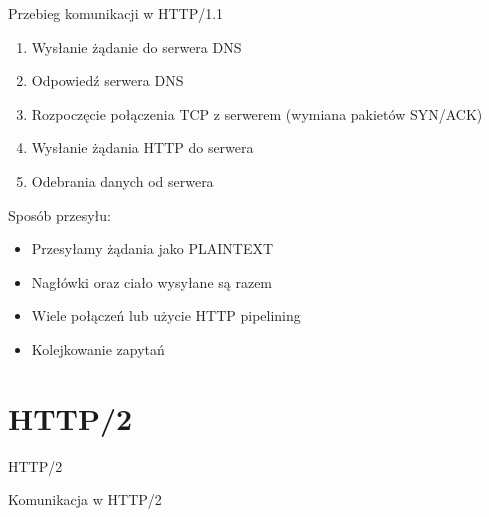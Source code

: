 \documentclass{beamer}
\begin{document}
\begin{frame}{Przebieg komunikacji w HTTP/1.1}
    \begin{enumerate}
        \item Wysłanie żądanie do serwera DNS
        \item Odpowiedź serwera DNS
        \item Rozpoczęcie połączenia TCP z serwerem (wymiana pakietów SYN/ACK)
        \item Wysłanie żądania HTTP do serwera
        \item Odebrania danych od serwera
    \end{enumerate}
    
    \pause
    
    \vspace{15pt}
    
    \begin{large}
    Sposób przesyłu:
    \end{large}
    \begin{itemize}
        \item Przesyłamy żądania jako PLAINTEXT
        \item Nagłówki oraz ciało wysyłane są razem
        \item Wiele połączeń lub użycie HTTP pipelining
        \item Kolejkowanie zapytań
    \end{itemize}
\end{frame}

\section{HTTP/2}
\begin{frame}{HTTP/2}
    \begin{center}
        \begin{Huge}
           Komunikacja w HTTP/2
        \end{Huge}
    \end{center}
\end{frame}
\end{document}
